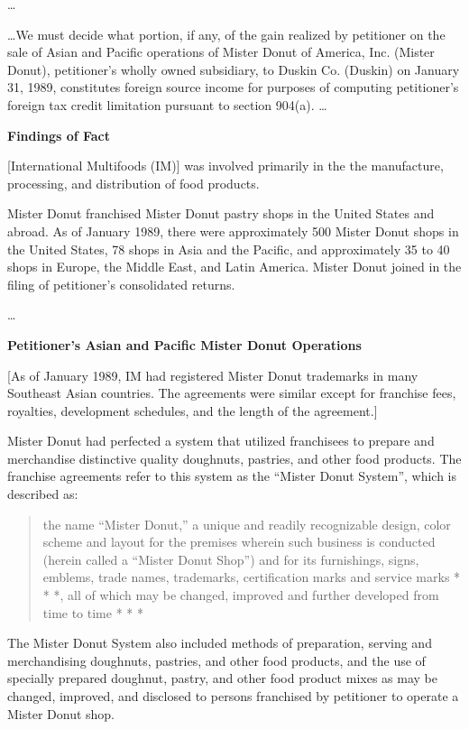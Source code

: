 \begin{select}
\ldots 

\ldots We must decide what portion, if any, of the gain realized by petitioner on the sale of Asian and Pacific operations of Mister Donut of America, Inc. (Mister Donut), petitioner's wholly owned subsidiary, to Duskin Co. (Duskin) on January 31, 1989,
constitutes foreign source income for purposes of computing petitioner's foreign tax credit limitation pursuant to section
904(a). \ldots

\begin{center} \textbf{Findings of Fact}
\end{center}
[International Multifoods (IM)] was involved primarily in the  the manufacture, processing, and distribution of food products.

Mister Donut franchised Mister Donut pastry shops in the United States and abroad. As of January 1989, there were
approximately 500 Mister Donut shops in the United States, 78 shops in Asia and the Pacific, and approximately 35 to 40
shops in Europe, the Middle East, and Latin America. Mister Donut joined in the filing of petitioner's consolidated returns.

\ldots
\begin{center} \textbf{Petitioner's Asian and Pacific Mister Donut Operations}
\end{center}
[As of January 1989, IM had registered Mister Donut trademarks in many Southeast Asian countries.  The agreements were similar except for franchise fees, royalties, development schedules, and the length of the agreement.]

Mister Donut had perfected a system that utilized franchisees to prepare and merchandise distinctive quality 
doughnuts, pastries, and other food products. The franchise agreements refer to this system as the ``Mister Donut System'',
which is described as:
\begin{quote} the name ``Mister Donut,'' a unique and readily recognizable design, color scheme and layout for the premises wherein such business is conducted (herein called a ``Mister Donut Shop'') and for its furnishings, signs,
emblems, trade names, trademarks, certification marks and service marks * * *, all of which may be changed,
improved and further developed from time to time * * *
\end{quote}
The Mister Donut System also included methods of preparation, serving and merchandising doughnuts, pastries, and
other food products, and the use of specially prepared doughnut, pastry, and other food product mixes as may be changed,
improved, and disclosed to persons franchised by petitioner to operate a Mister Donut shop.


\end{select}
